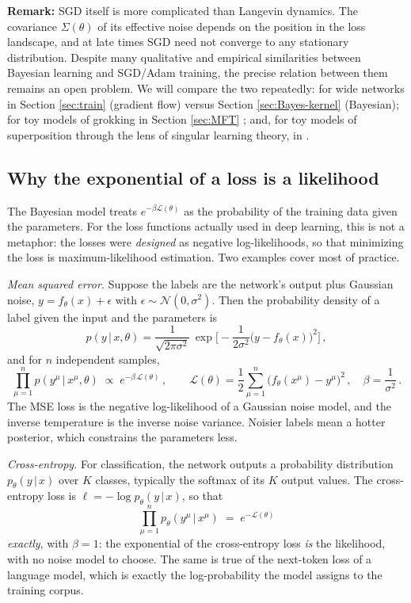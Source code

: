\documentclass[11pt]{article}
\newcommand{\CN}{{\mathcal N}}
\newcommand{\CL}{{\mathcal L}}
\begin{document}
\smallskip
\textbf{Remark:} SGD itself is more complicated than Langevin dynamics. The covariance $\Sigma(\theta)$ of its effective noise depends on the position in the loss landscape, and at late times SGD need not converge to any stationary distribution. Despite many qualitative and empirical similarities between Bayesian learning and SGD/Adam training, the precise relation between them remains an open problem. We will compare the two repeatedly: for wide networks in Section \ref{sec:train} (gradient flow) versus Section \ref{sec:Bayes-kernel} (Bayesian); for toy models of grokking in Section \ref{sec:MFT} \cite{rubin2024grokking}; and, for toy models of superposition \cite{elhage2022superposition} through the lens of singular learning theory, in \cite{chen2023dynamical}.

\subsection{Why the exponential of a loss is a likelihood}
\label{sec:loss-likelihood}

The Bayesian model treats $e^{-\beta\CL(\theta)}$ as the probability of the training data given the parameters. For the loss functions actually used in deep learning, this is not a metaphor: the losses were \emph{designed} as negative log-likelihoods, so that minimizing the loss is maximum-likelihood estimation. Two examples cover most of practice.

\emph{Mean squared error.} Suppose the labels are the network's output plus Gaussian noise, $y = f_\theta(x) + \epsilon$ with $\epsilon\sim\CN(0,\sigma^2)$. Then the probability density of a label given the input and the parameters is
%
\begin{equation}
    p(y\,|\,x,\theta) = \frac{1}{\sqrt{2\pi\sigma^2}}\,\exp\Big[-\frac{1}{2\sigma^2}\big(y-f_\theta(x)\big)^2\Big]\,,
\end{equation}
%
and for $n$ independent samples,
%
\begin{equation}
    \prod_{\mu=1}^n p(y^\mu\,|\,x^\mu,\theta) \;\propto\; e^{-\beta\,\CL(\theta)}\,,\qquad \CL(\theta) = \frac{1}{2}\sum_{\mu=1}^n\big(f_\theta(x^\mu)-y^\mu\big)^2\,,\quad \beta = \frac{1}{\sigma^2}\,. \label{mse-likelihood}
\end{equation}
%
The MSE loss is the negative log-likelihood of a Gaussian noise model, and the inverse temperature is the inverse noise variance. Noisier labels mean a hotter posterior, which constrains the parameters less.

\emph{Cross-entropy.} For classification, the network outputs a probability distribution $p_\theta(y\,|\,x)$ over $K$ classes, typically the softmax of its $K$ output values. The cross-entropy loss is $\ell = -\log p_\theta(y\,|\,x)$, so that
%
\begin{equation}
    \prod_{\mu=1}^n p_\theta(y^\mu\,|\,x^\mu) \;=\; e^{-\CL(\theta)} \label{ce-likelihood}
\end{equation}
%
\emph{exactly}, with $\beta = 1$: the exponential of the cross-entropy loss \emph{is} the likelihood, with no noise model to choose. The same is true of the next-token loss of a language model, which is exactly the log-probability the model assigns to the training corpus.
\end{document}
